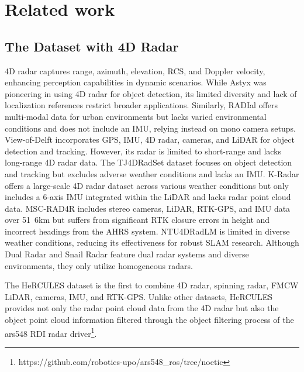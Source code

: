 \section{Related work}
\label{sec:relatedwork}
\subsection{The Dataset with 4D Radar}
 4D radar captures range, azimuth, elevation, \ac{RCS}, and Doppler velocity, enhancing perception capabilities in dynamic scenarios. While Astyx \cite{8904734} was pioneering in using 4D radar for object detection, its limited diversity and lack of localization references restrict broader applications. Similarly, RADIal \cite{Rebut_2022_CVPR} offers multi-modal data for urban environments but lacks varied environmental conditions and does not include an \ac{IMU}, relying instead on mono camera setups.
View-of-Delft \cite{palffy2022multi} incorporates \ac{GPS}, \ac{IMU}, 4D radar, cameras, and \ac{LiDAR} for object detection and tracking. However, its radar is limited to short-range and lacks long-range 4D radar data. The TJ4DRadSet dataset \cite{zheng2022tj4dradset} focuses on object detection and tracking but excludes adverse weather conditions and lacks an \ac{IMU}. K-Radar \cite{paek2022k} offers a large-scale 4D radar dataset across various weather conditions but only includes a 6-axis \ac{IMU} integrated within the \ac{LiDAR} and lacks radar point cloud data. MSC-RAD4R \cite{choi2023msc} includes stereo cameras, \ac{LiDAR}, RTK-GPS, and \ac{IMU} data over \unit{51.6}{km} but suffers from significant RTK closure errors in height and incorrect headings from the \ac{AHRS} system. NTU4DRadLM \cite{zhang2023ntu4dradlm} is limited in diverse weather conditions, reducing its effectiveness for robust \ac{SLAM} research. Although Dual Radar \cite{zhang2023dual} and Snail Radar \cite{huai2024snail} feature dual radar systems and diverse environments, they only utilize homogeneous radars.

The HeRCULES dataset is the first to combine 4D radar, spinning radar, \ac{FMCW} \ac{LiDAR}, cameras, \ac{IMU}, and RTK-GPS. Unlike other datasets, HeRCULES provides not only the radar point cloud data from the 4D radar but also the object point cloud information filtered through the object filtering process of the ars548 RDI radar driver\footnote{https://github.com/robotics-upo/ars548\_ros/tree/noetic}.

